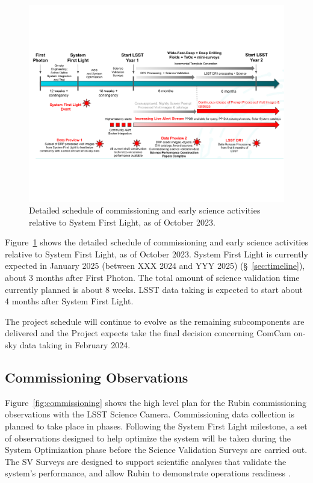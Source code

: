 \begin{figure}[htb]
\centering
\includegraphics[width=0.98\linewidth]{figures/rubinobs_on-sky_commissioning_and_early_science.pdf}
\caption{Detailed schedule of commissioning  and early science activities relative to System First Light, as of October 2023.}
\label{fig:commissioning-es-schedule}
\vspace{0.1cm}
\end{figure}

Figure~\ref{fig:commissioning-es-schedule} shows the detailed schedule of commissioning and early science activities relative to System First Light, as of October 2023.
System First Light is currently expected in January 2025 (between XXX 2024 and YYY 2025) (\S~\ref{sec:timeline}), about 3 months after First Photon. 
The total amount of science validation time currently planned is about 8 weeks.  
LSST data taking is expected to start about 4 months after System First Light.

The project schedule will continue to evolve as the remaining subcomponents are delivered and the Project expects take the final decision concerning ComCam on-sky data taking in February 2024.

\subsection{Commissioning Observations}
\label{ssec:commissioning-observations}

Figure~\ref{fig:commissioning} shows the high level plan for the Rubin commissioning observations with the LSST Science Camera.
Commissioning data collection is planned to take place in phases.
Following the System First Light milestone, a set of observations designed to help optimize the system will be taken during the System Optimization phase before the Science Validation Surveys are carried out. 
The SV Surveys are designed to support scientific analyses that validate the system's performance, and allow Rubin to demonstrate operations readiness .


